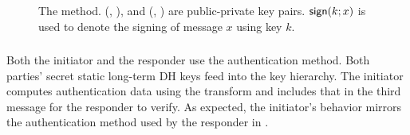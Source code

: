 \begin{figure}[h]
{}
    \caption{The \mSigStat{} method. (\mCredi{}, \mLtki), and
        (\mCredr{}, \mLtkr{}) are public-private key pairs. $\textsf{sign}(k; x)$ is
    used to denote the signing of message $x$ using key $k$.}
\label{fig:edhocsigstat}
\end{figure}

\spacehack
\subsubsection{\mStatStat}
Both the initiator and the responder use the \mStat{}
authentication method.
%
Both parties' secret static long-term DH keys feed into the key hierarchy.
%
The initiator computes authentication data using the \mAead{} transform
and includes that in the third message for the responder to verify.
%
As expected, the initiator's behavior mirrors the \mStat{} authentication
method used by the responder in \mSigStat{}.
%

